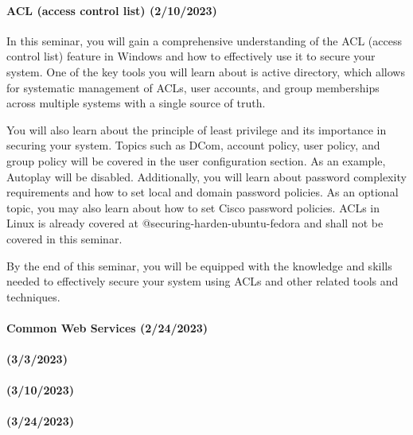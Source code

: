 \documentclass[
  letterpaper,
  DIV=11,
  numbers=noendperiod]{scrartcl}
\let\oldparagraph\paragraph
\renewcommand{\paragraph}[1]{\oldparagraph{#1}\mbox{}}
\begin{document}
\hypertarget{acl-access-control-list-2102023}{%
\paragraph{ACL (access control list)
(2/10/2023)}\label{acl-access-control-list-2102023}}

In this seminar, you will gain a comprehensive understanding of the ACL
(access control list) feature in Windows and how to effectively use it
to secure your system. One of the key tools you will learn about is
active directory, which allows for systematic management of ACLs, user
accounts, and group memberships across multiple systems with a single
source of truth.

You will also learn about the principle of least privilege and its
importance in securing your system. Topics such as DCom, account policy,
user policy, and group policy will be covered in the user configuration
section. As an example, Autoplay will be disabled. Additionally, you
will learn about password complexity requirements and how to set local
and domain password policies. As an optional topic, you may also learn
about how to set Cisco password policies. ACLs in Linux is already
covered at @securing-harden-ubuntu-fedora and shall not be covered in
this seminar.

By the end of this seminar, you will be equipped with the knowledge and
skills needed to effectively secure your system using ACLs and other
related tools and techniques.

\hypertarget{common-web-services-2242023}{%
\paragraph{Common Web Services
(2/24/2023)}\label{common-web-services-2242023}}

\hypertarget{section}{%
\paragraph{(3/3/2023)}\label{section}}

\hypertarget{section-1}{%
\paragraph{(3/10/2023)}\label{section-1}}

\hypertarget{section-2}{%
\paragraph{(3/24/2023)}\label{section-2}}
\end{document}
